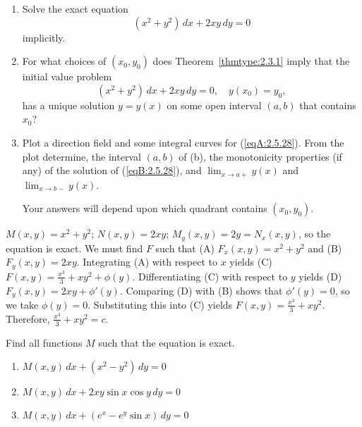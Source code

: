 \documentclass{ximera}
\begin{document}
\begin{problem}\label{exer:2.5.28}
\begin{enumerate}
\item %
Solve the exact equation
\begin{equation}\label{eqA:2.5.28}
(x^2+y^2)\,dx+2xy\,dy=0
\end{equation}
implicitly.
\item %
For what choices of $(x_0,y_0)$ does
Theorem~\ref{thmtype:2.3.1} imply that the initial value problem
\begin{equation}\label{eqB:2.5.28}
(x^2+y^2)\,dx+2xy\,dy=0,\quad y(x_0)=y_0,
\end{equation}
has a unique solution $y=y(x)$ on some open interval $(a,b)$
that contains $x_0$?
\item %
Plot a direction field and some integral curves for (\ref{eqA:2.5.28}). From
the plot determine,
the  interval $(a,b)$ of (b), the monotonicity
properties (if any) of the solution of (\ref{eqB:2.5.28}), and $\lim_{x\to a+}y(x)$ and $\lim_{x\to b-}y(x)$. 
\begin{hint}Your answers will
depend upon which quadrant contains $(x_0,y_0)$.
\end{hint}
\end{enumerate}



\begin{solution}
    $M(x,y)=x^2+y^2$;\;
$N(x,y)=2xy$;\;
$M_y(x,y)=2y=N_x(x,y)$,
so the  equation is exact.
We must find $F$ such that
(A) $F_x(x,y)=x^2+y^2$ and
(B) $F_y(x,y)=2xy$.
Integrating (A) with respect to $x$ yields
(C) $F(x,y)=\frac{x^3}{3}+xy^2+\phi(y)$.
Differentiating (C) with respect to $y$  yields
(D) $F_y(x,y)=2xy+\phi'(y)$.
Comparing (D) with (B)  shows that
$\phi'(y)=0$, so we take
$\phi(y)=0$.
Substituting this into (C) yields
$F(x,y)=\frac{x^3}{3}+xy^2$.
Therefore, $\frac{x^3}{3}+xy^2=c$.
\end{solution}
\end{problem}

\begin{problem}\label{exer:2.5.29}
Find all functions $M$ such that the equation is exact.
\begin{enumerate}
\item %
$M(x,y)\,dx+(x^2-y^2)\,dy=0$

\item %
$M(x,y)\,dx+2xy\sin x\cos y\,dy=0$

\item %
$M(x,y)\,dx+(e^x-e^y\sin x)\,dy=0$
\end{enumerate}
\end{problem}
\end{document}
